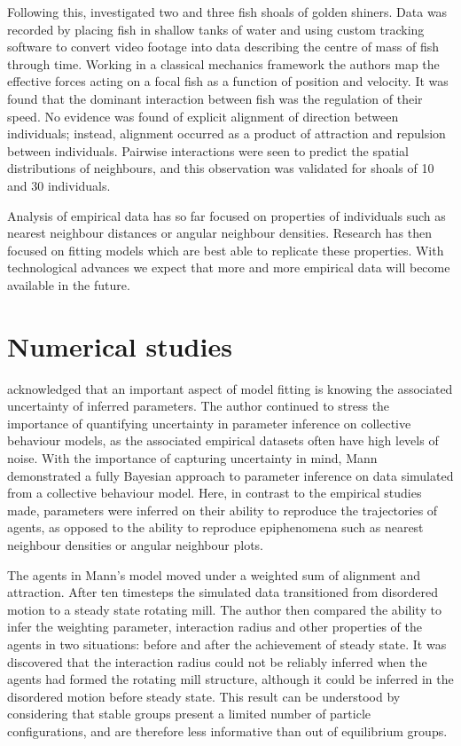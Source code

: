 Following this, \cite{katz11} investigated two and three fish shoals of golden shiners. Data was recorded by placing fish in shallow tanks of water and using custom tracking software to convert video footage into data describing the centre of mass of fish through time. Working in a classical mechanics framework the authors map the effective forces acting on a focal fish as a function of position and velocity. It was found that the dominant interaction between fish was the regulation of their speed. No evidence was found of explicit alignment of direction between individuals; instead, alignment occurred as a product of attraction and repulsion between individuals. Pairwise interactions were seen to predict the spatial distributions of neighbours, and this observation was validated for shoals of 10 and 30 individuals.

Analysis of empirical data has so far focused on properties of individuals such as nearest neighbour distances or angular neighbour densities. Research has then focused on fitting models which are best able to replicate these properties. With technological advances we expect that more and more empirical data will become available in the future.

\section{Numerical studies}
\label{sec:numerical_studies}

\citet{mann11} acknowledged that an important aspect of model fitting is knowing the associated uncertainty of inferred parameters. The author continued to stress the importance of quantifying uncertainty in parameter inference on collective behaviour models, as the associated empirical datasets often have high levels of noise. With the importance of capturing uncertainty in mind, Mann demonstrated a fully Bayesian approach to parameter inference on data simulated from a collective behaviour model. Here, in contrast to the empirical studies made, parameters were inferred on their ability to reproduce the trajectories of agents, as opposed to the ability to reproduce epiphenomena such as nearest neighbour densities or angular neighbour plots.

The agents in Mann's model moved under a weighted sum of alignment and attraction. After ten timesteps the simulated data transitioned from disordered motion to a steady state rotating mill. The author then compared the ability to infer the weighting parameter, interaction radius and other properties of the agents in two situations: before and after the achievement of steady state. It was discovered that the interaction radius could not be reliably inferred when the agents had formed the rotating mill structure, although it could be inferred in the disordered motion before steady state. This result can be understood by considering that stable groups present a limited number of particle configurations, and are therefore less informative than out of equilibrium groups.
